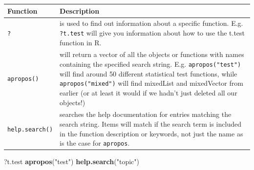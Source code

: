 \documentclass[a4paper]{book}
\newenvironment{Shaded}{\begin{snugshade}}{\end{snugshade}}
\newcommand{\KeywordTok}[1]{\textcolor[rgb]{0.13,0.29,0.53}{\textbf{{#1}}}}
\newcommand{\StringTok}[1]{\textcolor[rgb]{0.31,0.60,0.02}{{#1}}}
\newcommand{\NormalTok}[1]{{#1}}
\renewenvironment{Shaded}
{\vspace{1.5em}\begin{leftbar}\begin{snugshade}}
{\end{snugshade}\end{leftbar}\vspace{3pt}}
\begin{document}
\begin{longtable}[]{@{}ll@{}}
\toprule
\begin{minipage}[b]{0.14\columnwidth}\raggedright\strut
Function\strut
\end{minipage} & \begin{minipage}[b]{0.80\columnwidth}\raggedright\strut
Description\strut
\end{minipage}\tabularnewline
\midrule
\endhead
\begin{minipage}[t]{0.14\columnwidth}\raggedright\strut
\texttt{?}\strut
\end{minipage} & \begin{minipage}[t]{0.80\columnwidth}\raggedright\strut
is used to find out information about a specific function. E.g.
\texttt{?t.test} will give you information about how to use the t.test
function in R.\strut
\end{minipage}\tabularnewline
\begin{minipage}[t]{0.14\columnwidth}\raggedright\strut
\texttt{apropos()}\strut
\end{minipage} & \begin{minipage}[t]{0.80\columnwidth}\raggedright\strut
will return a vector of all the objects or functions with names
containing the specified search string. E.g. \texttt{apropos("test")}
will find around 50 different statistical test functions, while
\texttt{apropos("mixed")} will find mixedList and mixedVector from
earlier (or at least it would if we hadn't just deleted all our
objects!)\strut
\end{minipage}\tabularnewline
\begin{minipage}[t]{0.14\columnwidth}\raggedright\strut
\texttt{help.search()}\strut
\end{minipage} & \begin{minipage}[t]{0.80\columnwidth}\raggedright\strut
searches the help documentation for entries matching the search string.
Items will match if the search term is included in the function
description or keywords, not just the name as is the case for
\texttt{apropos}.\strut
\end{minipage}\tabularnewline
\bottomrule
\end{longtable}

\begin{Shaded}
\begin{Highlighting}[]
\NormalTok{?t.test}
\KeywordTok{apropos}\NormalTok{(}\StringTok{"test"}\NormalTok{)}
\KeywordTok{help.search}\NormalTok{(}\StringTok{"topic"}\NormalTok{)}
\end{Highlighting}
\end{Shaded}
\end{document}
